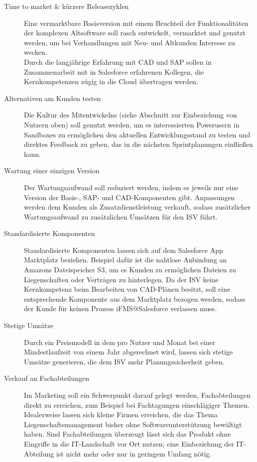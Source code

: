 \begin{description}
	\item[Time to market \& kürzere Releasezyklen] Eine vermarktbare 
Basisversion mit einem Bruchteil der Funktionalitäten der komplexen 
Altsoftware soll rasch entwickelt, vermarktet und genutzt werden, um bei 
Verhandlungen mit Neu- und Altkunden Interesse zu wecken. \\
Durch die langjährige Erfahrung mit CAD und SAP sollen in Zusammenarbeit mit in 
Salesforce erfahrenen Kollegen, die Kernkompetenzen zügig in die Cloud 
übertragen werden.
	\item[Alternativen am Kunden testen] Die Kultur 
des Mitentwickelns (siehe Abschnitt zur Einbeziehung von Nutzern oben) soll 
genutzt werden, um es interessierten Powerusern in Sandboxes zu ermöglichen den aktuellen 
Entwicklungsstand zu testen und direktes Feedback zu geben, das in die nächsten 
Sprintplanungen einfließen kann.
	\item[Wartung einer einzigen Version] Der Wartungsaufwand soll 
reduziert werden, indem es jeweils nur eine Version der Basis-, SAP- und 
CAD-Komponenten gibt. Anpassungen werden dem Kunden als Zusatzdienstleistung 
verkauft, sodass zusätzlicher Wartungsaufwand zu zusätzlichen Umsätzen für den 
 ISV führt.
	\item[Standardisierte Komponenten] Standardisierte Komponenten lassen 
sich auf dem Salesforce App Marktplatz beziehen. Beispiel dafür ist die 
nahtlose Anbindung an Amazons Dateispeicher S3, um es Kunden zu ermöglichen 
Dateien zu Liegenschaften oder Verträgen zu hinterlegen. Da der ISV keine 
Kernkompetenz beim Bearbeiten von CAD-Plänen besitzt, soll eine entsprechende 
Komponente aus dem Marktplatz bezogen werden, sodass der Kunde für keinen 
Prozess iFMS@Salesforce verlassen muss.
	\item[Stetige Umsätze] Durch ein Preismodell in dem pro Nutzer und 
Monat bei einer Mindestlaufzeit von einem Jahr abgerechnet wird, lassen sich 
stetige Umsätze generieren, die dem ISV mehr Planungssicherheit geben.
	\item[Verkauf an Fachabteilungen] Im Marketing soll ein Schwerpunkt 
darauf gelegt werden, Fachabteilungen direkt zu erreichen, zum Beispiel bei 
Fachtagungen einschlägiger Themen. Idealerweise lassen sich kleine Firmen 
erreichen, die das Thema Liegenschaftsmanagement bisher ohne 
Softwareunterstützung bewältigt haben. Sind Fachabteilungen überzeugt lässt 
sich das Produkt ohne Eingriffe in die IT-Landschaft vor Ort nutzen; eine 
Einbeziehung der IT-Abteilung ist nicht mehr oder nur in geringem Umfang nötig.
\end{description}

